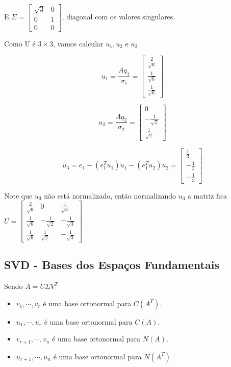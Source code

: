\documentclass[12pt]{article}
\begin{document}
E $\Sigma = \left[ \begin{array}{cc}
    \sqrt{3} & 0 \\
    0 & 1 \\
    0 & 0
\end{array} \right]$, diagonal com os valores singulares.

Como U é $3 \times 3$, vamos calcular $u_1, u_2$ e $u_3$

$$u_1 = \dfrac{A q_1}{\sigma_1} = \left[ \begin{array}{c}
    \frac{2}{\sqrt{6}} \\
    \frac{1}{\sqrt{6}} \\
    \frac{1}{\sqrt{6}}
\end{array} \right]$$

$$u_2 = \dfrac{A q_2}{\sigma_2} = \left[ \begin{array}{c}
    0 \\
    - \frac{1}{\sqrt{2}} \\
    \frac{1}{\sqrt{2}}
\end{array} \right]$$

$$u_3 = e_1 - (e_1^T u_1) u_1 - (e_1^T u_2) u_2 = \left[ \begin{array}{c}
    \frac{1}{3} \\
    - \frac{1}{3} \\
    - \frac{1}{3}
\end{array} \right]$$

Note que $u_3$ não está normalizado, então normalizando $u_3$ a matriz fica $U = \left[ \begin{array}{ccc}
    \frac{2}{\sqrt{6}} & 0 & \frac{1}{\sqrt{3}} \\
    \frac{1}{\sqrt{6}} & - \frac{1}{\sqrt{2}} & - \frac{1}{\sqrt{3}} \\
    \frac{1}{\sqrt{6}} & \frac{1}{\sqrt{2}} & - \frac{1}{\sqrt{3}}
\end{array} \right]$

\subsection*{SVD - Bases dos Espaços Fundamentais}
Sendo $A = U \Sigma V^T$

\begin{itemize}
    \item $v_1, \cdots, v_r$ é uma base ortonormal para $C(A^T)$.
    
    \item $u_1, \cdots, u_r$ é uma base ortonormal para $C(A)$.
    
    \item $v_{r+1}, \cdots, v_n$ é uma base ortonormal para $N(A)$.
    
    \item $u_{r+1}, \cdots, u_n$ é uma base ortonormal para $N(A^T)$
\end{itemize}
\end{document}
